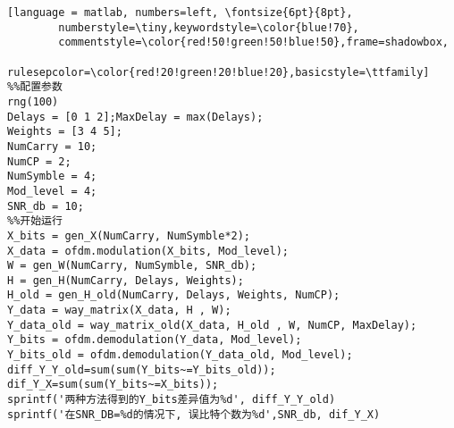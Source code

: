 \begin{lstlisting}[language = matlab, numbers=left, \fontsize{6pt}{8pt}, 
        numberstyle=\tiny,keywordstyle=\color{blue!70},  
        commentstyle=\color{red!50!green!50!blue!50},frame=shadowbox,  
        rulesepcolor=\color{red!20!green!20!blue!20},basicstyle=\ttfamily]  
%%配置参数
rng(100)
Delays = [0 1 2];MaxDelay = max(Delays);
Weights = [3 4 5];
NumCarry = 10;
NumCP = 2;
NumSymble = 4;
Mod_level = 4;
SNR_db = 10;
%%开始运行
X_bits = gen_X(NumCarry, NumSymble*2);
X_data = ofdm.modulation(X_bits, Mod_level);
W = gen_W(NumCarry, NumSymble, SNR_db);
H = gen_H(NumCarry, Delays, Weights);
H_old = gen_H_old(NumCarry, Delays, Weights, NumCP);
Y_data = way_matrix(X_data, H , W);
Y_data_old = way_matrix_old(X_data, H_old , W, NumCP, MaxDelay);
Y_bits = ofdm.demodulation(Y_data, Mod_level);
Y_bits_old = ofdm.demodulation(Y_data_old, Mod_level);
diff_Y_Y_old=sum(sum(Y_bits~=Y_bits_old));
dif_Y_X=sum(sum(Y_bits~=X_bits));
sprintf('两种方法得到的Y_bits差异值为%d', diff_Y_Y_old)
sprintf('在SNR_DB=%d的情况下, 误比特个数为%d',SNR_db, dif_Y_X)
 \end{lstlisting}  

